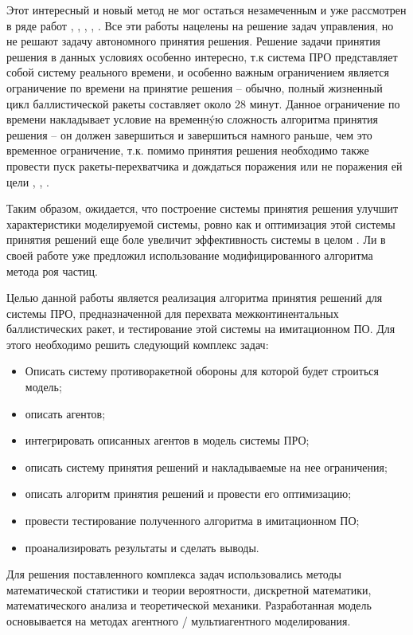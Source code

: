 Этот интересный и новый метод не мог остаться незамеченным и уже рассмотрен в ряде работ \cite{Nguyen:2014}, \cite{Armstrong:2014}, \cite{Sommerer:2012}, \cite{Cheng:2015}, \cite{Macal:2010}. Все эти работы нацелены на решение задач  управления, но не решают задачу автономного принятия решения. Решение задачи принятия решения в данных условиях особенно интересно, т.к система ПРО представляет собой систему реального времени, и особенно важным ограничением является ограничение по времени на принятие решения -- обычно, полный жизненный цикл баллистической ракеты составляет около 28 минут. Данное ограничение по времени накладывает условие на временн\'yю сложность алгоритма принятия решения -- он должен завершиться и завершиться намного раньше, чем это временное ограничение, т.к. помимо принятия решения необходимо также провести пуск ракеты-перехватчика и дождаться поражения или не поражения ей цели \cite{Holland:2011}, \cite{Lynch:2013}, \cite{Connors:2015}.

Таким образом, ожидается, что построение системы принятия решения улучшит характеристики моделируемой системы, ровно как и оптимизация этой системы принятия решений еще боле увеличит эффективность системы в целом \cite{Bui:1999}. Ли в своей работе \cite{Li:2015} уже предложил использование модифицированного алгоритма метода роя частиц.

Целью данной работы является реализация алгоритма принятия решений для системы ПРО, предназначенной для перехвата межконтинентальных баллистических ракет, и тестирование этой системы на имитационном ПО. Для этого необходимо решить следующий комплекс задач:

\begin{itemize}
	\item Описать систему противоракетной обороны для которой будет строиться модель;
	\item описать агентов;
	\item интегрировать описанных агентов в модель системы ПРО;
	\item описать систему принятия решений и накладываемые на нее ограничения;
	\item описать алгоритм принятия решений и провести его оптимизацию;
	\item провести тестирование полученного алгоритма в имитационном ПО;
	\item проанализировать результаты и сделать выводы. 
\end{itemize}

Для решения поставленного комплекса задач использовались методы математической статистики и теории вероятности, дискретной математики, математического анализа и теоретической механики. Разработанная модель основывается на методах агентного / мультиагентного моделирования.

